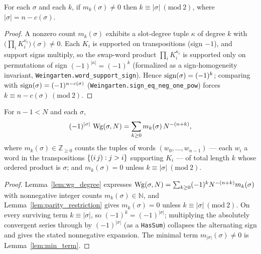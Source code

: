 \begin{lemma}\label{lem:parity_restriction}
\leanok
{}
For each $\sigma$ and each $k$, if $m_k(\sigma)\ne0$ then
$k\equiv|\sigma|\ (\mathrm{mod}\ 2)$, where $|\sigma|=n-c(\sigma)$.
\end{lemma}
\begin{proof}\leanok{}
A nonzero count $m_k(\sigma)$ exhibits a slot-degree tuple $\kappa$ of degree $k$
with $\bigl(\prod_iK_i^{\kappa_i}\bigr)(\sigma)\ne0$. Each $K_i$ is supported on
transpositions (sign $-1$), and support signs multiply, so the swap-word product
$\prod_iK_i^{\kappa_i}$ is supported only on permutations of sign $(-1)^{|\kappa|}=(-1)^k$
(formalized as a sign-homogeneity invariant, \texttt{Weingarten.word\_support\_sign}).
Hence $\operatorname{sign}(\sigma)=(-1)^k$; comparing with $\operatorname{sign}(\sigma)=(-1)^{n-c(\sigma)}$
(\texttt{Weingarten.sign\_eq\_neg\_one\_pow}) forces $k\equiv n-c(\sigma)\ (\mathrm{mod}\ 2)$.
\end{proof}

\begin{lemma}\label{lem:expansion}
\leanok
{}
For $n-1<N$ and each $\sigma$,
\[
(-1)^{|\sigma|}\,\operatorname{Wg}(\sigma,N)
=\sum_{k\ge0} m_k(\sigma)\,N^{-(n+k)},
\]
where $m_k(\sigma)\in\mathbb{Z}_{\ge0}$ counts the tuples of words
$(w_0,\dots,w_{n-1})$ --- each $w_i$ a word in the transpositions
$\{(i\,j):j>i\}$ supporting $K_i$ --- of total length $k$ whose
ordered product is $\sigma$; and $m_k(\sigma)=0$ unless
$k\equiv|\sigma|\ (\mathrm{mod}\ 2)$.
\end{lemma}
\begin{proof}
\leanok
{}
Lemma~\ref{lem:wg_degree} expresses
$\operatorname{Wg}(\sigma,N)=\sum_{k\ge0}(-1)^kN^{-(n+k)}m_k(\sigma)$ with nonnegative integer
counts $m_k(\sigma)\in\mathbb N$, and Lemma~\ref{lem:parity_restriction} gives
$m_k(\sigma)=0$ unless $k\equiv|\sigma|\ (\mathrm{mod}\ 2)$. On every surviving term
$k\equiv|\sigma|$, so $(-1)^k=(-1)^{|\sigma|}$; multiplying the absolutely
convergent series through by $(-1)^{|\sigma|}$ (as a \texttt{HasSum}) collapses the
alternating sign and gives the stated nonnegative expansion. The minimal term
$m_{|\sigma|}(\sigma)\ne0$ is Lemma~\ref{lem:min_term}.
\end{proof}

